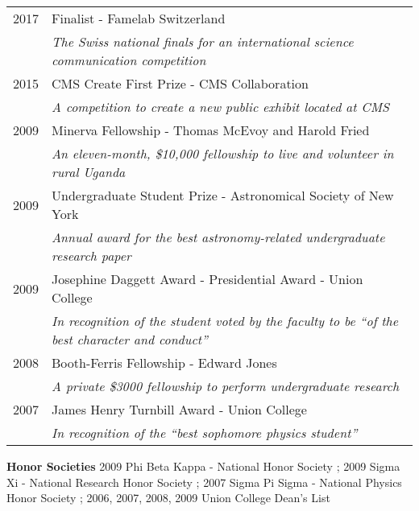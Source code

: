 \documentclass[letterpaper,11pt]{article} %
\begin{document}
\begin{tabular}{rl}	

2017 & Finalist - Famelab Switzerland \\
 {}  & \emph{The Swiss national finals for an international science communication competition} \\

2015 & CMS Create First Prize - CMS Collaboration \\
 {}  & \emph{A competition to create a new public exhibit located at CMS} \\

2009 & Minerva Fellowship - Thomas McEvoy and Harold Fried \\
 {}  & \emph{An eleven-month, \$10,000 fellowship to live and volunteer in rural Uganda} \\

2009 & Undergraduate Student Prize - Astronomical Society of New York \\
 {}  & \emph{Annual award for the best astronomy-related undergraduate research paper} \\

2009 & Josephine Daggett Award - Presidential Award - Union College \\
 {}  & \emph{In recognition of the student voted by the faculty to be ``of the best character and conduct''} \\

2008 & Booth-Ferris Fellowship - Edward Jones \\
 {}  & \emph{A private \$3000 fellowship to perform undergraduate research} \\

2007 & James Henry Turnbill Award - Union College \\
 {}  & \emph{In recognition of the ``best sophomore physics student''} 

\end{tabular}

{\bf Honor Societies} 2009 Phi Beta Kappa - National Honor Society ; 2009 Sigma Xi - National Research Honor Society ; 2007 Sigma Pi Sigma - National Physics Honor Society ; 2006, 2007, 2008, 2009 Union College Dean's List


%
%
\end{document}
